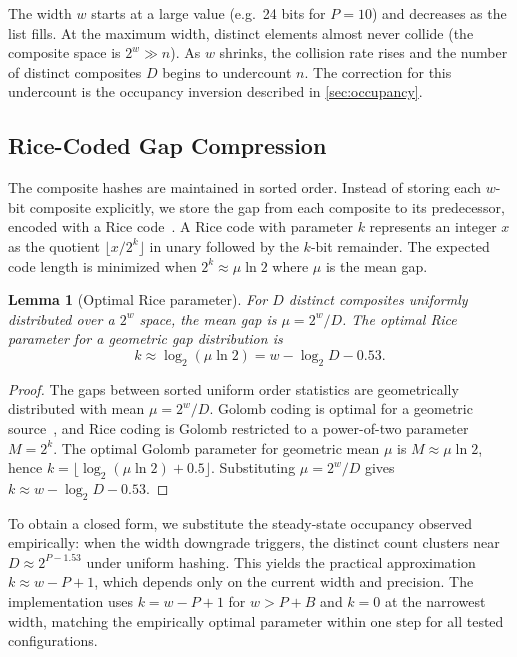 \documentclass[11pt,letterpaper]{article}
\newtheorem{lemma}[theorem]{Lemma}
\begin{document}
The width $w$ starts at a large value (e.g.\ 24 bits for $P = 10$) and
decreases as the list fills. At the maximum width, distinct elements
almost never collide (the composite space is $2^w \gg n$). As $w$
shrinks, the collision rate rises and the number of distinct composites
$D$ begins to undercount $n$. The correction for this undercount is the
occupancy inversion described in \autoref{sec:occupancy}.

\subsection{Rice-Coded Gap Compression}

The composite hashes are maintained in sorted order. Instead of storing
each $w$-bit composite explicitly, we store the gap from each composite
to its predecessor, encoded with a Rice code~\cite{rice1959class}. A Rice code with
parameter $k$ represents an integer $x$ as the quotient
$\lfloor x / 2^k \rfloor$ in unary followed by the $k$-bit remainder.
The expected code length is minimized when $2^k \approx \mu \ln 2$
where $\mu$ is the mean gap.

\begin{lemma}[Optimal Rice parameter]
For $D$ distinct composites uniformly distributed over a $2^w$ space,
the mean gap is $\mu = 2^w / D$. The optimal Rice parameter for a
geometric gap distribution is
\[
k \approx \log_2(\mu \ln 2) = w - \log_2 D - 0.53.
\]
\end{lemma}

\begin{proof}
The gaps between sorted uniform order statistics are geometrically
distributed with mean $\mu = 2^w / D$. Golomb coding is optimal for a
geometric source~\cite{gallager1975golomb}, and Rice coding is Golomb
restricted to a power-of-two parameter $M = 2^k$. The optimal Golomb
parameter for geometric mean $\mu$ is $M \approx \mu \ln 2$, hence
$k = \lfloor \log_2(\mu \ln 2) + 0.5 \rfloor$. Substituting $\mu = 2^w / D$
gives $k \approx w - \log_2 D - 0.53$.
\end{proof}

To obtain a closed form, we substitute the steady-state occupancy
observed empirically: when the width downgrade triggers, the distinct
count clusters near $D \approx 2^{P - 1.53}$ under uniform hashing.
This yields the practical approximation $k \approx w - P + 1$, which
depends only on the current width and precision. The implementation
uses $k = w - P + 1$ for $w > P + B$ and $k = 0$ at the narrowest
width, matching the empirically optimal parameter within one step for
all tested configurations.
\end{document}
